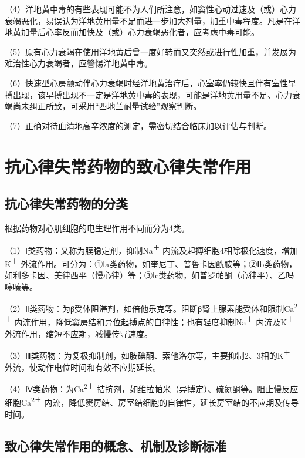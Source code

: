 （4）洋地黄中毒的有些表现可能不为人们所注意，如窦性心动过速及（或）心力衰竭恶化，易误认为洋地黄用量不足而进一步加大剂量，加重中毒程度。凡是在洋地黄加量后心率反而加快及（或）心力衰竭恶化者，应考虑中毒可能。

（5）原有心力衰竭在使用洋地黄后曾一度好转而又突然或进行性加重，并发展为难治性心力衰竭者，应警惕洋地黄中毒。

（6）快速型心房颤动伴心力衰竭时经洋地黄治疗后，心室率仍较快且伴有室性早搏出现，该早搏出现不一定是洋地黄中毒的表现，可能是洋地黄用量不足、心力衰竭尚未纠正所致，可采用“西地兰耐量试验”观察判断。

（7）正确对待血清地高辛浓度的测定，需密切结合临床加以评估与判断。

\protect\hypertarget{text00054.htmlux5cux23subid652}{}{}

\section{抗心律失常药物的致心律失常作用}

\protect\hypertarget{text00054.htmlux5cux23subid653}{}{}

\subsection{抗心律失常药物的分类}

根据药物对心肌细胞的电生理作用不同而分为4类。

（1）Ⅰ类药物：又称为膜稳定剂，抑制Na\textsuperscript{＋}
内流及起搏细胞4相除极化速度，增加K\textsuperscript{＋}
外流作用。可分为：①Ⅰa类药物，如奎尼丁、普鲁卡因酰胺等；②Ⅰb类药物，如利多卡因、美律西平（慢心律）等；③Ⅰc类药物，如普罗帕酮（心律平）、乙吗噻嗪等。

（2）Ⅱ类药物：为β受体阻滞剂，如倍他乐克等。阻断β肾上腺素能受体和限制Ca\textsuperscript{2＋}
内流作用，降低窦房结和异位起搏点的自律性；也有轻度抑制Na\textsuperscript{＋}
内流及K\textsuperscript{＋} 外流作用，缩短不应期，减慢传导速度。

（3）Ⅲ类药物：为复极抑制剂，如胺碘酮、索他洛尔等，主要抑制2、3相的K\textsuperscript{＋}
外流，使动作电位时间和有效不应期延长。

（4）Ⅳ类药物：为Ca\textsuperscript{2＋}
拮抗剂，如维拉帕米（异搏定）、硫氮酮等。阻止慢反应细胞Ca\textsuperscript{2＋}
内流，降低窦房结、房室结细胞的自律性，延长房室结的不应期及传导时间。

\protect\hypertarget{text00054.htmlux5cux23subid654}{}{}

\subsection{致心律失常作用的概念、机制及诊断标准}

